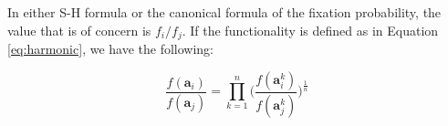 \documentclass[13pt]{article}
\begin{document}
In either S-H formula or the canonical formula of the fixation probability, the value that is of concern is $f_i/f_j$.
If the functionality is defined as in Equation \ref{eq:harmonic}, we have the following:

\begin{equation}
\frac{f(\mathbf{a}_i)}{f(\mathbf{a}_j)} = \prod_{k=1}^n\Big( \frac{f(\mathbf{a}_i^k)}{f(\mathbf{a}_j^k)}\Big)^{\frac{1}{n}}
\end{equation}
\end{document}
